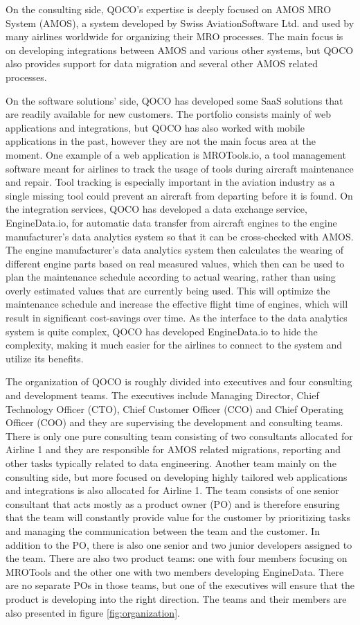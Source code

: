 On the consulting side, QOCO's expertise is deeply focused on AMOS MRO System (AMOS), a system developed by Swiss AviationSoftware Ltd. and used
by many airlines worldwide for organizing their MRO processes. The main focus is on developing integrations between AMOS and various other systems,
but QOCO also provides support for data migration and several other AMOS related processes.

On the software solutions' side, QOCO has developed some SaaS solutions that are readily available for new customers. The portfolio consists mainly of
web applications and integrations, but QOCO has also worked with mobile applications in the past, however they are not the main focus area
at the moment. One example of a web application is MROTools.io, a tool management software meant for airlines to track the usage of tools during aircraft
maintenance and repair. Tool tracking is especially important in the aviation industry as a single missing tool could prevent an aircraft from departing
before it is found. On the integration services, QOCO has developed a data exchange service, EngineData.io, for automatic data transfer from aircraft
engines to the engine manufacturer's data analytics system so that it can be cross-checked with AMOS. The engine manufacturer's data analytics system then
calculates the wearing of different engine parts based on real measured values, which then can be used to plan the maintenance schedule according to actual wearing,
rather than using overly estimated values that are currently being used. This will optimize the maintenance schedule and increase the effective flight time of engines, which
will result in significant cost-savings over time. As the interface to the data analytics system is quite complex, QOCO has developed EngineData.io to hide the complexity,
making it much easier for the airlines to connect to the system and utilize its benefits.

The organization of QOCO is roughly divided into executives and four consulting and development teams. The executives include Managing Director, Chief Technology Officer (CTO),
Chief Customer Officer (CCO) and Chief Operating Officer (COO) and they are supervising the development and consulting teams. There is only one pure consulting
team consisting of two consultants allocated for Airline 1 and they are responsible for AMOS related migrations, reporting and other tasks typically related to
data engineering. Another team mainly on the consulting side, but more focused on developing highly tailored web applications and integrations is also allocated for Airline 1.
The team consists of one senior consultant that acts mostly as a product owner (PO) and is therefore ensuring that the team will constantly provide value for the customer by
prioritizing tasks and managing the communication between the team and the customer. In addition to the PO, there is also one senior and two junior developers
assigned to the team. There are also two product teams: one with four members focusing on MROTools and the other one with two members developing EngineData.
There are no separate POs in those teams, but
one of the executives will ensure that the product is developing into the right direction. The teams and their members are also presented in figure \ref{fig:organization}.

